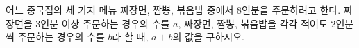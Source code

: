 어느 중국집의 세 가지 메뉴 짜장면, 짬뽕, 볶음밥 중에서 $8$인분을 주문하려고 한다. 짜장면을 $3$인분 이상 주문하는 경우의 수를 $a$, 짜장면, 짬뽕, 볶음밥을 각각 적어도 $2$인분씩 주문하는 경우의 수를 $b$라 할 때, $a+b$의 값을 구하시오.
